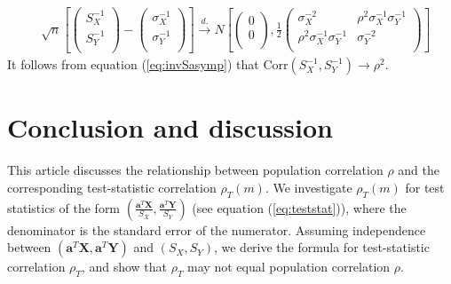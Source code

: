 \documentclass[12pt, a4paper]{article}
\newcommand{\cor}{\text{Corr}}
\begin{document}
	\begin{equation}\label{eq:invSasymp}
	\begin{aligned}
	& \sqrt{n}\left[\left( \begin{array}{c}
	S_X^{-1}\\
	S_Y^{-1}\\
	\end{array}\right)
	-
	\left( \begin{array}{c}
	\sigma_X^{-1}\\
	\sigma_Y^{-1}\\
	\end{array}\right)
	\right]
	\stackrel{d.}{\longrightarrow} 
	N\left[
	\left(\begin{array}{c}
	0\\
	0\\
	\end{array} \right), 
	\frac{1}{2}\left(
	\begin{array}{cc}
	\sigma_X^{-2} &\rho^2\sigma_X^{-1}\sigma_Y^{-1} \\
	\rho^2\sigma_X^{-1}\sigma_Y^{-1}  &\sigma_Y^{-2} \\
	\end{array}
	\right)
	\right] 
	\end{aligned}
	\end{equation}
	It follows from equation (\ref{eq:invSasymp}) that $\cor(S_X^{-1}, S_Y^{-1}) \rightarrow 
	\rho^2$.
	
	
	
	\section{Conclusion and discussion}
	
	This article discusses the relationship between population correlation $\rho$ and the 
	corresponding test-statistic correlation $\rho_T(m)$. We 
	investigate $\rho_T(m)$ for test statistics 
	of the form $(\frac{\bm a^T\bm X}{S_X}, \frac{\bm a^T\bm Y}{S_Y})$ (see equation 
	(\ref{eq:teststat})), where the denominator is the standard error of the numerator. Assuming 
	independence between $(\bm a^T\bm X, \bm a^T\bm Y)$ and $(S_X, S_Y)$, we derive the formula for 
	test-statistic correlation $\rho_T$, and show that $\rho_T$ may not equal population 
	correlation $\rho$.  
	
\end{document}
